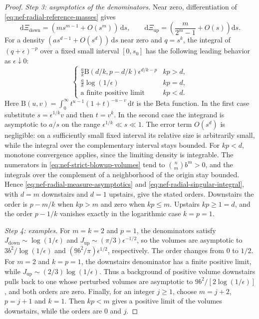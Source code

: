 \begin{proof}
\emph{Step 3: asymptotics of the denominators.} Near zero, differentiation of \eqref{eq:nef-radial-reference-masses} gives
\begin{equation}\label{eq:nef-radial-measure-asymptotics}
 \mathrm{d}\Xi_{\mathrm{down}}=(m s^{m-1}+O(s^m))\,\mathrm{d} s,\qquad
 \mathrm{d}\Xi_{\mathrm{up}}=\left(\frac{m}{2^m-1}+O(s)\right)\mathrm{d} s.
\end{equation}
For a density $(a s^{d-1}+O(s^d))\,\mathrm{d} s$ near zero and $q=s^k$, the integral of $(q+\epsilon)^{-p}$ over a fixed small interval $[0,s_0]$ has the following leading behavior as $\epsilon\downarrow0$:
\begin{equation}\label{eq:nef-radial-singular-integral}
 \begin{cases}
 \displaystyle\frac{a}{k}\mathrm B(d/k,p-d/k)\epsilon^{d/k-p}
     &kp>d,\\[4pt]
 \displaystyle\frac{a}{k}\log(1/\epsilon)&kp=d,\\[4pt]
 \text{a finite positive limit}&kp<d.
 \end{cases}
\end{equation}
Here $\mathrm B(u,v)=\int_0^\infty t^{u-1}(1+t)^{-u-v}\,\mathrm{d} t$ is the Beta function. In the first case substitute $s=\epsilon^{1/k}v$ and then $t=v^k$. In the second case the integrand is asymptotic to $a/s$ on the range $\epsilon^{1/k}\ll s\ll1$. The error term $O(s^d)$ is negligible: on a sufficiently small fixed interval its relative size is arbitrarily small, while the integral over the complementary interval stays bounded. For $kp<d$, monotone convergence applies, since the limiting density is integrable. The numerators in \eqref{eq:nef-strict-blowup-volumes} tend to $\binom{n}{m}b^m>0$, and the integrals over the complement of a neighborhood of the origin stay bounded. Hence \eqref{eq:nef-radial-measure-asymptotics} and \eqref{eq:nef-radial-singular-integral}, with $d=m$ downstairs and $d=1$ upstairs, give the stated orders. Downstairs the order is $p-m/k$ when $kp>m$ and zero when $kp\leq m$. Upstairs $kp\geq1=d$, and the order $p-1/k$ vanishes exactly in the logarithmic case $k=p=1$.

\emph{Step 4: examples.} For $m=k=2$ and $p=1$, the denominators satisfy $J_{\mathrm{down}}\sim\log(1/\epsilon)$ and $J_{\mathrm{up}}\sim(\pi/3)\epsilon^{-1/2}$, so the volumes are asymptotic to $3b^2/\log(1/\epsilon)$ and $(9b^2/\pi)\epsilon^{1/2}$, respectively. The order changes from $0$ to $1/2$. For $m=2$ and $k=p=1$, the downstairs denominator has a finite positive limit, while $J_{\mathrm{up}}\sim(2/3)\log(1/\epsilon)$. Thus a background of positive volume downstairs pulls back to one whose perturbed volumes are asymptotic to $9b^2/[2\log(1/\epsilon)]$, and both orders are zero. Finally, for an integer $j\geq1$, choose $m=j+2$, $p=j+1$ and $k=1$. Then $kp<m$ gives a positive limit of the volumes downstairs, while the orders are $0$ and $j$.
\end{proof}

